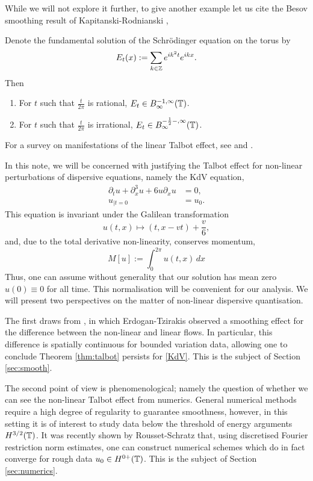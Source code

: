 While we will not explore it further, to give another example let us cite the Besov smoothing result of Kapitanski-Rodnianski \cite{KapitanskiRodnianski1999}, 

\begin{theorem}
	Denote the fundamental solution of the Schr\"odinger equation on the torus by 
		\[
			E_t (x) 
				:= \sum_{k \in \mathbb Z} e^{i k^2 t} e^{ikx}. 
		\]
	Then 
		\begin{enumerate}
			\item For $t$ such that $\tfrac{t}{2\pi}$ is rational, $E_t \in B^{-1, \infty}_\infty (\mathbb T)$. 
			\item For $t$ such that $\tfrac{t}{2\pi}$ is irrational, $E_t \in B^{-\frac12-, \infty}_\infty (\mathbb T)$. 
		\end{enumerate}
\end{theorem}

For a survey on manifestations of the linear Talbot effect, see 
\cite[Chapter 2.3]{ErdoganTzirakis2016} and \cite{Olver2010}. 

In this note, we will be concerned with justifying the Talbot effect for non-linear perturbations of dispersive equations, namely the KdV equation, 
\begin{equation}\label{eq:KdV}\tag{KdV}
	\begin{split}
		\partial_t u + \partial_x^3 u + 6 u \partial_x u 
			&= 0,\\
		u_{|t = 0}
			&= u_0. 
	\end{split}
	\end{equation}
This equation is invariant under the Galilean transformation 
		\[
			u(t, x) \mapsto (t, x - vt) + \frac{v}{6},
		\]
and, due to the total derivative non-linearity, conserves momentum, 
	\[
		M[u]
			:= \int_{0}^{2\pi} u(t, x) \, dx
	\]
Thus, one can assume without generality that our solution has mean zero $\widehat u(0) \equiv 0$ for all time. This normalisation will be convenient for our analysis. We will present two perspectives on the matter of non-linear dispersive quantisation.

The first draws from \cite{ErdoganTzirakis2013}, in which Erdogan-Tzirakis observed a smoothing effect for the difference between the non-linear and linear flows. In particular, this difference is spatially continuous for bounded variation data, allowing one to conclude Theorem \ref{thm:talbot} persists for \eqref{KdV}. This is the subject of Section \ref{sec:smooth}. 

The second point of view is phenomenological; namely the question of whether we can see the non-linear Talbot effect from numerics. General numerical methods require a high degree of regularity to guarantee smoothness, however, in this setting it is of interest to study data below the threshold of energy arguments $H^{3/2} (\mathbb T)$. It was recently shown by Rousset-Schratz \cite{RoussetSchratz2022} that, using discretised Fourier restriction norm estimates, one can construct numerical schemes which do in fact converge for rough data $u_0 \in H^{0+}( \mathbb T)$. This is the subject of Section \ref{sec:numerics}. 